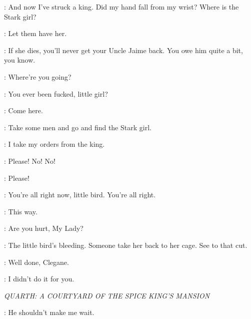 \TYRION: And now I've struck a king. Did my hand fall from my wrist?  Where is the Stark girl? 

\JOFFREY: Let them have her. 

\TYRION: If she dies, you'll never get your Uncle Jaime back. You owe him quite a bit, you know. 


\RIOTERb: Where're you going?


\RIOTERa: You ever been fucked, little girl?

\RIOTERb: Come here.

\TYRION: Take some men and go and find the Stark girl. 

\MERYN: I take my orders from the king.



\SANSA: Please! No! No!


\RIOTERb: Please! 

\HOUND: You're all right now, little bird. You're all right.


\HOUND: This way.

\TYRION: Are you hurt, My Lady?


\HOUND: The little bird's bleeding. Someone take her back to her cage. See to that cut. 

\TYRION: Well done, Clegane. 

\HOUND: I didn't do it for you. 


\scene

\textit{QUARTH: A COURTYARD OF THE SPICE KING'S MANSION}


\DAENERYS: He shouldn't make me wait. 

